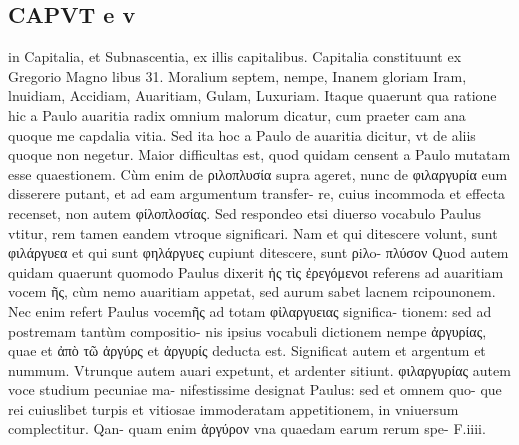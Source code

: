 \documentclass{article}
\begin{document}
\begin{pages}
\section*{CAPVT e v }
\marginpar{[ p.455 ]}\pstart in Capitalia, et Subnascentia, ex illis capitalibus.  \pend\pstart Capitalia constituunt ex Gregorio Magno libus 31. Moralium septem, nempe, Inanem gloriam Iram, lnuidiam, Accidiam, Auaritiam, Gulam, Luxuriam. Itaque quaerunt qua ratione hic a Paulo auaritia radix omnium malorum dicatur, cum praeter cam ana quoque me capdalia vitia. Sed ita hoc a Paulo de auaritia dicitur, vt de aliis quoque non negetur.  \pend\pstart Maior difficultas est, quod quidam censent a Paulo mutatam esse quaestionem. Cùm enim de ριλοπλυσία supra ageret, nunc de φιλαργυρία eum disserere putant, et ad eam argumentum transfer- re, cuius incommoda et effecta recenset, non autem φίλοπλοσίας. Sed respondeo etsi diuerso vocabulo Paulus vtitur, rem tamen eandem vtroque  significari. Nam et qui ditescere volunt, sunt φιλάργυεα et qui sunt φηλάργυες cupiunt ditescere, sunt ρiλo- πλύσον Quod autem quidam quaerunt quomodo Paulus dixerit ἡς τὶς ἐρεγόμενοι referens ad auaritiam vocem ῆς, cùm nemo auaritiam appetat, sed aurum sabet lacnem rcipounonem. Nec enim refert Paulus vocemῆς ad totam φἰλαργυειας significa- tionem: sed ad postremam tantùm compositio- nis ipsius vocabuli dictionem nempe ἀργυρίας, quae et ἀπὸ τῶ ἀργύρς et ἀργυρίς deducta est. Significat autem et argentum et nummum. Vtrunque autem auari expetunt, et ardenter sitiunt.  \pend\pstart φιλαργυρίας autem voce studium pecuniae ma- nifestissime designat Paulus: sed et omnem quo- que rei cuiuslibet turpis et vitiosae immoderatam appetitionem, in vniuersum complectitur. Qan- quam enim ἀργύρον vna quaedam earum rerum spe- F.iiii.  \pend

\end{pages}
\end{document}
